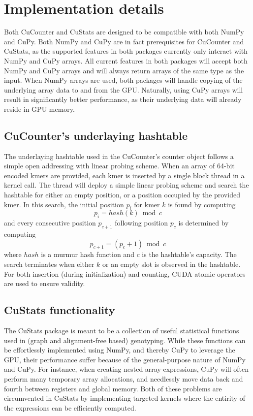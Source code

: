 \section*{Implementation details}
Both CuCounter and CuStats are designed to be compatible with both NumPy and CuPy.
Both NumPy and CuPy are in fact prerequisites for CuCounter and CuStats, as the supported features in both packages currently only interact with NumPy and CuPy arrays.
All current features in both packages will accept both NumPy and CuPy arrays and will always return arrays of the same type as the input.
When NumPy arrays are used, both packages will handle copying of the underlying array data to and from the GPU.
Naturally, using CuPy arrays will result in significantly better performance, as their underlying data will already reside in GPU memory.

\subsection*{CuCounter's underlaying hashtable}
The underlaying hashtable used in the CuCounter's counter object follows a simple open addressing with linear probing scheme. 
When an array of 64-bit encoded kmers are provided, each kmer is inserted by a single block thread in a kernel call. 
The thread will deploy a simple linear probing scheme and search the hashtable for either an empty position, or a position occupied by the provided kmer.
In this search, the initial position $p_i$ for kmer $k$ is found by computing
\begin{equation}
  p_i=hash(k) \bmod c
\end{equation}
and every consecutive position $p_{c+1}$ following position $p_c$ is determined by computing
\begin{equation}
  p_{c+1}=(p_c+1) \bmod c
\end{equation}
where $hash$ is a murmur hash function and $c$ is the hashtable's capacity.
The search terminates when either $k$ or an empty slot is observed in the hashtable.
For both insertion (during initialization) and counting, CUDA atomic operators are used to ensure validity.

\subsection*{CuStats functionality}
The CuStats package is meant to be a collection of useful statistical functions used in (graph and alignment-free based) genotyping.
While these functions can be effortlessly implemented using NumPy, and thereby CuPy to leverage the GPU, their performance suffer because of the general-purpose nature of NumPy and CuPy.
For instance, when creating nested array-expressions, CuPy will often perform many temporary array allocations, and needlessly move data back and fourth between registers and global memory.
Both of these problems are circumvented in CuStats by implementing targeted kernels where the entirity of the expressions can be efficiently computed.
